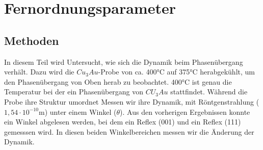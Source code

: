 \documentclass[
	a4paper,
	12pt,
	pagesize,
	ngerman
]{scrartcl}
\begin{document}
\newpage
\section{Fernordnungsparameter}
\subsection{Methoden}
In diesem Teil wird Untersucht, wie sich die Dynamik beim Phasenübergang verhält. Dazu wird die $Cu_3Au$-Probe von ca. 400°C auf 375°C herabgekühlt, um den Phasenübergang von Oben herab zu beobachtet. 400°C ist genau die Temperatur bei der ein Phasenübergang von $CU_3Au$ stattfindet. Während die Probe ihre Struktur umordnet Messen wir ihre Dynamik, mit Röntgenstrahlung ($1,54 \cdot 10^{-10}$m) unter einem Winkel ($\theta$). Aus den vorherigen Ergebnissen konnte ein Winkel abgelesen werden,
bei dem ein Reflex (001) und ein Reflex (111) gemesssen wird. In diesen beiden Winkelbereichen messen wir die Änderung der Dynamik.
\end{document}
